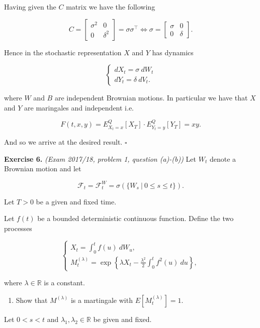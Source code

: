 \documentclass[
]{book}
\providecommand{\tightlist}{%
  \setlength{\itemsep}{0pt}\setlength{\parskip}{0pt}}
\begin{document}
Having given the \(C\) matrix we have the following

\[
C=
\begin{bmatrix}
\sigma^2 & 0\\
0 & \delta^2
\end{bmatrix}=\sigma\sigma ^\top\iff\sigma =
\begin{bmatrix}
\sigma & 0\\
0 & \delta
\end{bmatrix}.
\]

Hence in the stochastic representation \(X\) and \(Y\) has dynamics

\[
\left\{
\begin{matrix}
dX_t=\sigma\ dW_t\\
dY_t=\delta\ dV_t.
\end{matrix}
\right.
\]

where \(W\) and \(B\) are independent Brownian motions. In particular we have that \(X\) and \(Y\) are maringales and independent i.e.

\[
F(t,x,y)=E^Q_{X_t=x}[X_T]\cdot E^Q_{Y_t=y}[Y_T]=xy.
\]

And so we arrive at the desired result. \(\square\)

\textbf{Exercise 6.} \emph{(Exam 2017/18, problem 1, question (a)-(b))} Let \(W_t\) denote a Brownian motion and let

\[
\mathcal{F}_t=\mathcal{F}_t^W=\sigma(\{W_s\ \vert\ 0\le s\le t\}).
\]

Let \(T>0\) be a given and fixed time.

Let \(f(t)\) be a bounded deterministic continuous function. Define the two processes

\[
\begin{cases}
X_t=\int_0^tf(u)\ dW_u,\\
M^{(\lambda)}_t=\exp\left\{\lambda X_t-\frac{\lambda^2}{2}\int_0^t f^2(u)\ du\right\},
\end{cases}
\]

where \(\lambda\in\mathbb{R}\) is a constant.

\begin{enumerate}
\def\labelenumi{\alph{enumi}.}
\tightlist
\item
  Show that \(M^{(\lambda)}\) is a martingale with \(E[M_t^{(\lambda)}]=1\).
\end{enumerate}

Let \(0<s<t\) and \(\lambda_1,\lambda_2\in \mathbb{R}\) be given and fixed.
\end{document}
